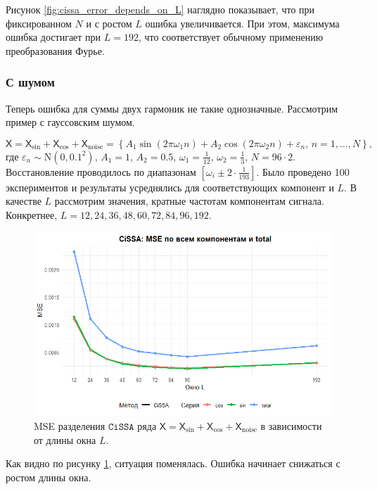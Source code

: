 \documentclass[12pt, specialist, subf
]{disser}
\theoremstyle{definition}
\newcommand{\CISSA}{\texttt{CiSSA}}
\newcommand{\TS}{\mathsf{X}}
\begin{document}
Рисунок \ref{fig:cissa_error_depends_on_L} наглядно показывает, что при фиксированном $N$ и с ростом $L$ ошибка увеличивается. При этом, максимума ошибка достигает при $L = 192$, что соответствует обычному применению преобразования Фурье.


\subsubsection*{С шумом}

Теперь ошибка для суммы двух гармоник не такие однозначные. Рассмотрим пример с гауссовским шумом.

\[
\TS = \TS_{\sin} + \TS_{\cos} +\TS_{\mathrm{noise}} = \left\{  
A_1 \sin(2\pi \omega_1 n ) + A_2  \cos(2\pi \omega_2 n ) + \varepsilon_n, \, n = 1, \dots, N
\right\},
\] где $\varepsilon_n \sim \mathrm N(0, 0.1^2)$, $A_1 = 1$, $A_2 = 0.5$, $\omega_1 = \frac{1}{12}$, $\omega_2 = \frac{1}{3}$, $N = 96 \cdot 2$. Восстановление проводилось по диапазонам $[\omega_i \pm 2 \cdot \frac{1}{193}]$. Было проведено 100 экспериментов и результаты усреднялись для соответствующих компонент и $L$. В качестве $L$ рассмотрим значения, кратные частотам компонентам сигнала. Конкретнее,  $L = 12, 24, 36, 48, 60, 72, 84, 96, 192$.


\begin{figure}[H]
	\centering
	\includegraphics[width=1\textwidth]{img/cissa_errors_plot_cos_noised.png}
	\caption{MSE разделения $\CISSA$ ряда $\TS = \TS_{\sin} + \TS_{\cos} +\TS_{\mathrm{noise}}$ в зависимости от длины окна $L$.}
	\label{fig:cissa_error_cos_noised_depends_on_L}
\end{figure}


Как видно по рисунку \ref{fig:cissa_error_cos_noised_depends_on_L}, ситуация поменялась. Ошибка начинает снижаться с ростом длины окна. 
\end{document}

